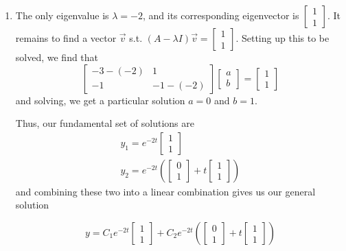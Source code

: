 \documentclass[12pt]{article}
\begin{document}
\begin{enumerate}
          \pagebreak

    \item The only eigenvalue is $\lambda=-2$, and its corresponding eigenvector is $\begin{bmatrix}
        1 \\ 1
    \end{bmatrix}$.
    It remains to find a vector $\vec{v}$ s.t. $(A-\lambda I)\vec{v}=\begin{bmatrix}
        1 \\ 1
    \end{bmatrix}$.
    Setting up this to be solved, we find that
    \[\begin{bmatrix}
        -3-(-2) & 1 \\
        -1 & -1-(-2)
    \end{bmatrix}\begin{bmatrix}
        a \\ b
    \end{bmatrix}=\begin{bmatrix}
        1 \\ 1
    \end{bmatrix}\]
    and solving, we get a particular solution $a=0$ and $b=1$.

    Thus, our fundamental set of solutions are
    \begin{gather*}
        y_1 = e^{-2t}\begin{bmatrix}1 \\ 1\end{bmatrix} \\
        y_2 = e^{-2t}\left(\begin{bmatrix}0 \\ 1\end{bmatrix}+t\begin{bmatrix}1 \\ 1\end{bmatrix}\right)
    \end{gather*}
    and combining these two into a linear combination gives us our general solution

    \[y=C_1e^{-2t}\begin{bmatrix}1 \\ 1\end{bmatrix}+C_2e^{-2t}\left(\begin{bmatrix}0 \\ 1\end{bmatrix}+t\begin{bmatrix}1 \\ 1\end{bmatrix}\right)\]


\end{enumerate}
\end{document}
